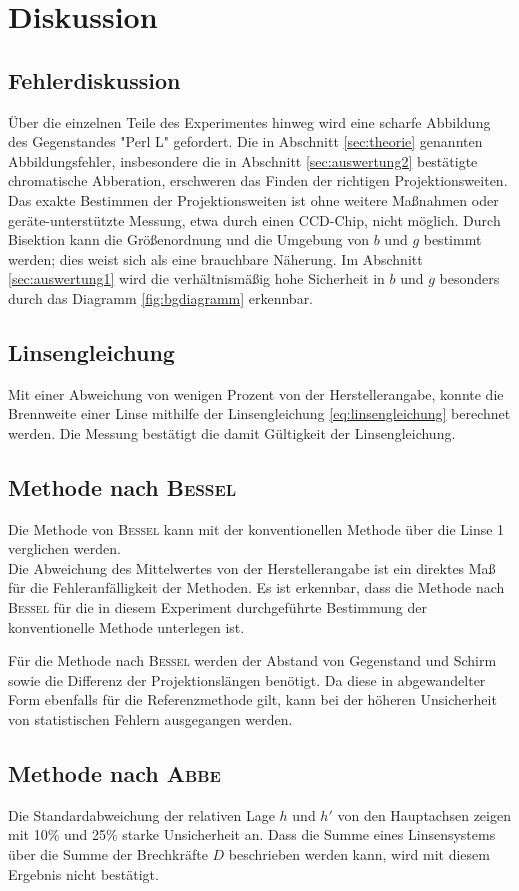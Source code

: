\section{Diskussion}
\label{sec:Diskussion}
\subsection{Fehlerdiskussion}
Über die einzelnen Teile des Experimentes hinweg wird eine scharfe Abbildung des Gegenstandes "Perl L" gefordert.
Die in Abschnitt \ref{sec:theorie} genannten Abbildungsfehler, 
insbesondere die in Abschnitt \ref{sec:auswertung2} bestätigte chromatische Abberation, 
erschweren das Finden der richtigen Projektionsweiten. 
Das exakte Bestimmen der Projektionsweiten ist ohne weitere Maßnahmen oder geräte-unterstützte Messung, etwa durch einen CCD-Chip, nicht möglich.
Durch Bisektion kann die Größenordnung und die Umgebung von $b$ und $g$ bestimmt werden; dies weist sich als eine brauchbare Näherung.
Im Abschnitt \ref{sec:auswertung1} wird die verhältnismäßig hohe Sicherheit in $b$ und $g$ besonders durch das Diagramm \ref{fig:bgdiagramm} erkennbar.

\subsection{Linsengleichung}
Mit einer Abweichung von wenigen Prozent von der Herstellerangabe, konnte die Brennweite einer Linse mithilfe der Linsengleichung \eqref{eq:linsengleichung} berechnet werden.
Die Messung bestätigt die damit Gültigkeit der Linsengleichung.

\subsection{Methode nach \texorpdfstring{\textsc{Bessel}}{Bessel}}
Die Methode von \texorpdfstring{\textsc{Bessel}}{Bessel} kann mit der konventionellen Methode über die Linse 1 verglichen werden.\\
Die Abweichung des Mittelwertes von der Herstellerangabe ist ein direktes Maß für die Fehleranfälligkeit der Methoden. 
Es ist erkennbar, dass die Methode nach \texorpdfstring{\textsc{Bessel}}{Bessel} für die in diesem Experiment durchgeführte Bestimmung der konventionelle Methode unterlegen ist.

Für die Methode nach \texorpdfstring{\textsc{Bessel}}{Bessel} werden der Abstand von Gegenstand und Schirm sowie die Differenz der Projektionslängen benötigt. 
Da diese in abgewandelter Form ebenfalls für die Referenzmethode gilt, kann bei der höheren Unsicherheit von statistischen Fehlern ausgegangen werden.

\subsection{Methode nach \texorpdfstring{\textsc{Abbe}}{Abbe}}
Die Standardabweichung der relativen Lage $h$ und $h'$ von den Hauptachsen zeigen mit 10\% und 25\% starke Unsicherheit an.
Dass die Summe eines Linsensystems über die Summe der Brechkräfte $D$ beschrieben werden kann, wird mit diesem Ergebnis nicht bestätigt.